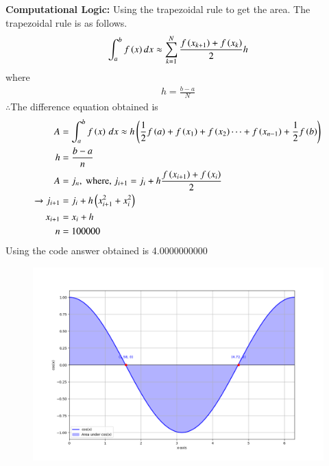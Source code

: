 \documentclass[journal]{IEEEtran}
\begin{document}
\textbf{Computational Logic:} 
Using the trapezoidal rule to get the area. The trapezoidal rule is as follows.
\begin{align}
    \int^{b}_{a} f\left(x\right)dx\approx \sum^{N}_{k=1}\frac{f\left(x_{k+1}\right)+f\left(x_{k}\right)}{2}h
\end{align}
where
\begin{align}
    h=\frac{b-a}{N}
\end{align}
$\therefore$The difference equation obtained is\\
\begin{align}
    A &= \int_a^b f\left(x\right)\, dx \approx h\left(\frac{1}{2}f\left(a\right) + f\left(x_1\right) + f\left(x_2\right) \cdots + f\left(x_{n-1}\right) + \frac{1}{2}f\left(b\right)\right)\\
    h &= \frac{b-a}{n}\\
    A &= j_n, \text{ where, } j_{i + 1} = j_i + h\frac{f\left(x_{i+1}\right) + f\left(x_i\right)}{2}\\ 
        \xrightarrow{} j_{i + 1} &= j_i + h\left({x_{i+1}^2}+{x_{i}^2}\right)\\
    x_{i+1} &= x_i + h\\
    n&=100000
\end{align}
Using the code answer obtained is 4.0000000000
\begin{figure}[h]
    \centering
    \includegraphics[width=\columnwidth]{fig/figs.png}
 \end{figure}
\end{document}

